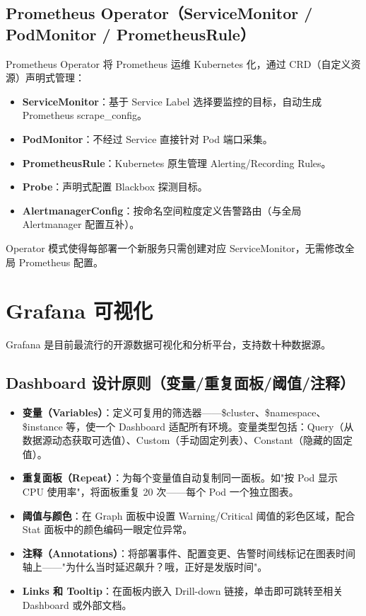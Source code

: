 \documentclass[12pt,UTF8]{ctexbook}
\begin{document}
  \section{Prometheus Operator（ServiceMonitor / PodMonitor / PrometheusRule）}

Prometheus Operator 将 Prometheus 运维 Kubernetes 化，通过 CRD（自定义资源）声明式管理：

\begin{itemize}
	\item \textbf{ServiceMonitor}：基于 Service Label 选择要监控的目标，自动生成 Prometheus scrape\_config。
	\item \textbf{PodMonitor}：不经过 Service 直接针对 Pod 端口采集。
	\item \textbf{PrometheusRule}：Kubernetes 原生管理 Alerting/Recording Rules。
	\item \textbf{Probe}：声明式配置 Blackbox 探测目标。
	\item \textbf{AlertmanagerConfig}：按命名空间粒度定义告警路由（与全局 Alertmanager 配置互补）。
\end{itemize}

Operator 模式使得每部署一个新服务只需创建对应 ServiceMonitor，无需修改全局 Prometheus 配置。

\chapter{Grafana 可视化}
\label{chap:grafana}

Grafana 是目前最流行的开源数据可视化和分析平台，支持数十种数据源。

  \section{Dashboard 设计原则（变量/重复面板/阈值/注释）}

\begin{itemize}
	\item \textbf{变量（Variables）}：定义可复用的筛选器——\$cluster、\$namespace、\$instance 等，使一个 Dashboard 适配所有环境。变量类型包括：Query（从数据源动态获取可选值）、Custom（手动固定列表）、Constant（隐藏的固定值）。
	\item \textbf{重复面板（Repeat）}：为每个变量值自动复制同一面板。如"按 Pod 显示 CPU 使用率"，将面板重复 20 次——每个 Pod 一个独立图表。
	\item \textbf{阈值与颜色}：在 Graph 面板中设置 Warning/Critical 阈值的彩色区域，配合 Stat 面板中的颜色编码一眼定位异常。
	\item \textbf{注释（Annotations）}：将部署事件、配置变更、告警时间线标记在图表时间轴上——"为什么当时延迟飙升？哦，正好是发版时间"。
	\item \textbf{Links 和 Tooltip}：在面板内嵌入 Drill-down 链接，单击即可跳转至相关 Dashboard 或外部文档。
\end{itemize}
\end{document}
